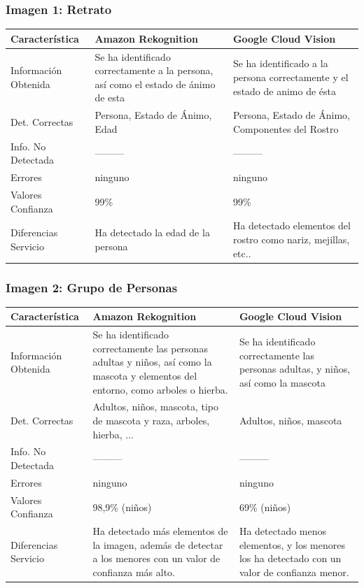 \subsubsection{Imagen 1: Retrato}
\begin{center}
	\renewcommand{\arraystretch}{1.2}
	\begin{tabular}{|p{5cm}|p{5cm}|p{5cm}|}
		\hline
		\textbf{Característica} & \textbf{Amazon Rekognition} & \textbf{Google Cloud Vision} \\
		\hline
		Información Obtenida & Se ha identificado correctamente a la persona, así como el estado de ánimo de esta  & Se ha identificado a la persona correctamente y el estado de animo de ésta \\
		\hline
		Det. Correctas & Persona, Estado de Ánimo, Edad & Persona, Estado de Ánimo, Componentes del Rostro \\
		\hline
		Info. No Detectada & --------- & --------- \\
		\hline
		Errores & ninguno & ninguno \\
		\hline
		Valores Confianza & 99\% & 99\% \\
		\hline
		Diferencias Servicio & Ha detectado la edad de la persona & Ha detectado elementos del rostro como nariz, mejillas, etc.. \\
		\hline
	\end{tabular}
\end{center} 

\subsubsection{Imagen 2: Grupo de Personas}

\begin{center}
	\renewcommand{\arraystretch}{1.2}
	\begin{tabular}{|p{5cm}|p{5cm}|p{5cm}|}
		\hline
		\textbf{Característica} & \textbf{Amazon Rekognition} & \textbf{Google Cloud Vision} \\
		\hline
		Información Obtenida & Se ha identificado correctamente las personas adultas y niños, así como la mascota y elementos del entorno, como arboles o hierba. & Se ha identificado correctamente las personas adultas, y niños, así como la mascota\\
		\hline
		Det. Correctas & Adultos, niños, mascota, tipo de mascota y raza, arboles, hierba, ...  &  Adultos, niños, mascota\\
		\hline
		Info. No Detectada & --------- & --------- \\
		\hline
		Errores & ninguno & ninguno \\
		\hline
		Valores Confianza & 98,9\% (niños) & 69\% (niños)\\
		\hline
		Diferencias Servicio & Ha detectado más elementos de la imagen, además de detectar a los menores con un valor de confianza más alto. & Ha detectado menos elementos, y los menores los ha detectado con un valor de confianza menor. \\
		\hline
	\end{tabular}
\end{center}  



